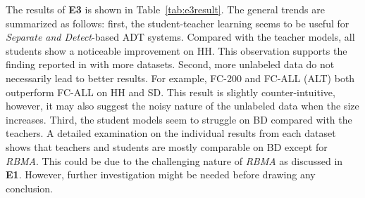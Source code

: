 \documentclass{article}
\begin{document}
The results of \textbf{E3} is shown in Table~\ref{tab:e3result}. The general trends are summarized as follows: first, the student-teacher learning seems to be useful for \textit{Separate and Detect}-based ADT systems. Compared with the teacher models, all students show a noticeable improvement on HH. This observation supports the finding reported in \cite{Wu2017} with more datasets. Second, more unlabeled data do not necessarily lead to better results. For example, FC-200 and FC-ALL (ALT) both outperform FC-ALL on HH and SD. This result is slightly counter-intuitive, however, it may also suggest the noisy nature of the unlabeled data when the size increases. Third, the student models seem to struggle on BD compared with the teachers. A detailed examination on the individual results from each dataset shows that teachers and students are mostly comparable on BD except for \textit{RBMA}. This could be due to the challenging nature of \textit{RBMA} as discussed in \textbf{E1}. However, further investigation might be needed before drawing any conclusion. 
\end{document}

